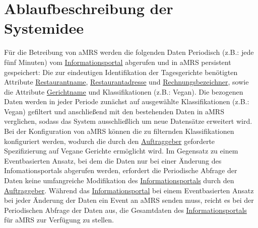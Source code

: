 \section{Ablaufbeschreibung der Systemidee}\label{cha:AblaufbeschreibungderSystemidee}
Für die Betreibung von \ac{aMRS} werden die folgenden Daten Periodisch (z.B.: jede fünf Minuten) vom \hyperref[gls:informationsportal]{Informationsportal} abgerufen und in \ac{aMRS} persistent gespeichert:
Die zur eindeutigen Identifikation der Tagesgerichte benötigten Attribute \hyperref[gls:restaurantname]{Restaurantname}, \hyperref[gls:restaurantadresse]{Restaurantadresse} und \hyperref[gls:Rechnungsbezeichner]{Rechnungsbezeichner}, sowie die Attribute \hyperref[gls:gerichtname]{Gerichtname} und Klassifikationen (z.B.: Vegan).
Die bezogenen Daten werden in jeder Periode zunächst auf ausgewählte Klassifikationen (z.B.: Vegan) gefiltert und anschließend mit den bestehenden Daten in \ac{aMRS} verglichen, sodass das System ausschließlich um neue Datensätze erweitert wird.
Bei der Konfiguration von \ac{aMRS} können die zu filternden Klassifikationen konfiguriert werden, wodurch die durch den \hyperref[gls:auftraggeber]{Auftraggeber} geforderte Spezifizierung auf Vegane Gerichte ermöglicht wird.
\newparagraph
Im Gegensatz zu einem Eventbasierten Ansatz, bei dem die Daten nur bei einer Änderung des Infomationsportals abgerufen werden, erfordert die Periodische Abfrage der Daten keine umfangreiche Modifikation des \hyperref[gls:informationsportal]{Informationsportals} durch den \hyperref[gls:auftraggeber]{Auftraggeber}.
Während das \hyperref[gls:informationsportal]{Informationsportal} bei einem Eventbasierten Ansatz bei jeder Änderung der Daten ein Event an \ac{aMRS} senden muss, reicht es bei der Periodischen Abfrage der Daten aus, die Gesamtdaten des \hyperref[gls:informationsportal]{Informationsportals} für \ac{aMRS} zur Verfügung zu stellen.
\newparagraph
